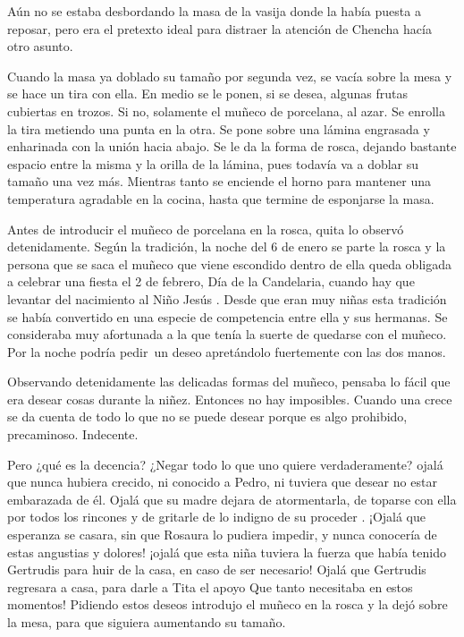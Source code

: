 Aún no se estaba desbordando la masa de la vasija donde la había puesta
a reposar, pero era el pretexto ideal para distraer la atención de
Chencha hacía otro asunto.

Cuando la masa ya doblado su tamaño por segunda vez, se vacía sobre la
mesa y se hace un tira con ella. En medio se le ponen, si se desea,
algunas frutas cubiertas en trozos. Si no, solamente el muñeco de
porcelana, al azar. Se enrolla la tira metiendo una punta en la otra. Se
pone sobre una lámina engrasada y enharinada con la unión hacia abajo.
Se le da la forma de rosca, dejando bastante espacio entre la misma y la
orilla de la lámina, pues todavía va a doblar su tamaño una vez más.
Mientras tanto se enciende el horno para mantener una temperatura
agradable en la cocina, hasta que termine de esponjarse la masa.

Antes de introducir el muñeco de porcelana en la rosca, quita lo
observó detenidamente. Según la tradición, la noche del 6 de enero se
parte la rosca y la persona que se saca el muñeco que viene escondido
dentro de ella queda obligada a celebrar una fiesta el 2 de febrero, Día
de la Candelaria, cuando hay que levantar del nacimiento al Niño Jesús .
Desde que eran muy niñas esta tradición se había convertido en una
especie de competencia entre ella y sus hermanas. Se consideraba muy
afortunada a la que tenía la suerte de quedarse con el muñeco. Por la
noche podría pedir~un deseo apretándolo fuertemente con las dos
manos.

Observando detenidamente las delicadas formas del muñeco, pensaba lo
fácil que era desear cosas durante la niñez. Entonces no hay imposibles.
Cuando una crece se da cuenta de todo lo que no se puede desear porque
es algo prohibido, precaminoso. Indecente.

Pero ¿qué es la decencia? ¿Negar todo lo que uno quiere verdaderamente?
ojalá que nunca hubiera crecido, ni conocido a Pedro, ni tuviera que
desear no estar embarazada de él. Ojalá que su madre dejara de
atormentarla, de toparse con ella por todos los rincones y de gritarle
de lo indigno de su proceder . ¡Ojalá que esperanza se casara, sin que
Rosaura lo pudiera impedir, y nunca conocería de estas angustias y
dolores! ¡ojalá que esta niña tuviera la fuerza que había tenido
Gertrudis para huir de la casa, en caso de ser necesario! Ojalá que
Gertrudis regresara a casa, para darle a Tita el apoyo Que tanto
necesitaba en estos momentos! Pidiendo estos deseos introdujo el muñeco
en la rosca y la dejó sobre la mesa, para que siguiera aumentando su
tamaño.

